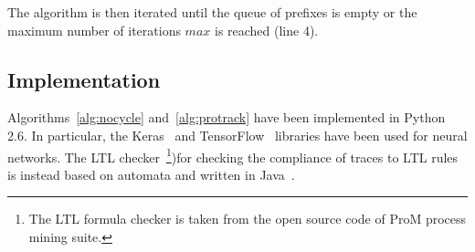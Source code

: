 The algorithm is then iterated until the queue of prefixes is empty or the maximum number of iterations $max$ is reached (line 4).












\subsection{Implementation}
\label{ssec:implementation}
Algorithms~\ref{alg:nocycle} and~\ref{alg:protrack} have been implemented in Python 2.6. In particular, the Keras~\cite{chollet2015keras} and TensorFlow~\cite{tensorflow2015-whitepaper} libraries have been used for neural networks. The LTL checker~\cite{vanderAalst2005}\footnote{The LTL formula checker is taken from the open source code of ProM process mining suite.})for checking the compliance of traces to LTL rules is instead based on automata and written in Java~\cite{Westergaard2040296}. 

